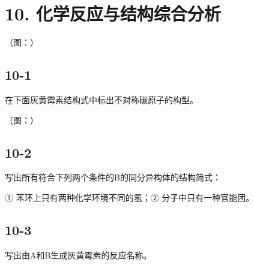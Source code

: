 \section*{10. 化学反应与结构综合分析}
（图：）

\subsection*{10-1}
在下⾯灰⻩霉素结构式中标出不对称碳原⼦的构型。

（图：）

\subsection*{10-2}
写出所有符合下列两个条件的B的同分异构体的结构简式：

① 苯环上只有两种化学环境不同的氢；② 分⼦中只有⼀种官能团。

\subsection*{10-3}
写出由A和B⽣成灰⻩霉素的反应名称。
